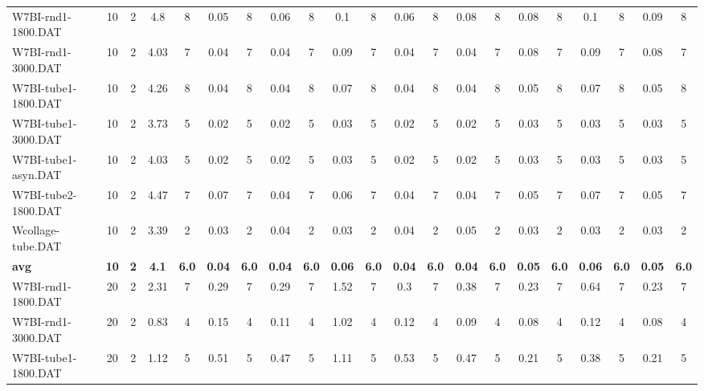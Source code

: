 \begin{sidewaystable}[!ht]
{\begin{tabular}{lcccccccccccccccccccc}
W7BI-rnd1-1800.DAT & 10 & 2 & 4.8 & 8 &  \textcolor{blue2}{0.05} & 8 & 0.06 & 8 & 0.1 & 8 & 0.06 & 8 & 0.08 & 8 & 0.08 & 8 & 0.1 & 8 & 0.09 & 8 \\
W7BI-rnd1-3000.DAT & 10 & 2 & 4.03 & 7 &  \textcolor{blue2}{0.04} & 7 &  \textcolor{blue2}{0.04} & 7 & 0.09 & 7 &  \textcolor{blue2}{0.04} & 7 &  \textcolor{blue2}{0.04} & 7 & 0.08 & 7 & 0.09 & 7 & 0.08 & 7 \\
W7BI-tube1-1800.DAT & 10 & 2 & 4.26 & 8 &  \textcolor{blue2}{0.04} & 8 &  \textcolor{blue2}{0.04} & 8 & 0.07 & 8 &  \textcolor{blue2}{0.04} & 8 &  \textcolor{blue2}{0.04} & 8 & 0.05 & 8 & 0.07 & 8 & 0.05 & 8 \\
W7BI-tube1-3000.DAT & 10 & 2 & 3.73 & 5 &  \textcolor{blue2}{0.02} & 5 &  \textcolor{blue2}{0.02} & 5 & 0.03 & 5 &  \textcolor{blue2}{0.02} & 5 &  \textcolor{blue2}{0.02} & 5 & 0.03 & 5 & 0.03 & 5 & 0.03 & 5 \\
W7BI-tube1-asyn.DAT & 10 & 2 & 4.03 & 5 &  \textcolor{blue2}{0.02} & 5 &  \textcolor{blue2}{0.02} & 5 & 0.03 & 5 &  \textcolor{blue2}{0.02} & 5 &  \textcolor{blue2}{0.02} & 5 & 0.03 & 5 & 0.03 & 5 & 0.03 & 5 \\
W7BI-tube2-1800.DAT & 10 & 2 & 4.47 & 7 & 0.07 & 7 &  \textcolor{blue2}{0.04} & 7 & 0.06 & 7 &  \textcolor{blue2}{0.04} & 7 &  \textcolor{blue2}{0.04} & 7 & 0.05 & 7 & 0.07 & 7 & 0.05 & 7 \\
Wcollage-tube.DAT & 10 & 2 & 3.39 & 2 &  \textcolor{blue2}{0.03} & 2 & 0.04 & 2 &  \textcolor{blue2}{0.03} & 2 & 0.04 & 2 & 0.05 & 2 &  \textcolor{blue2}{0.03} & 2 &  \textcolor{blue2}{0.03} & 2 &  \textcolor{blue2}{0.03} & 2 \\
\cline{1-21} \textbf{avg} & \textbf{10} & \textbf{2} & \textbf{4.1} & \textbf{6.0} & \textbf{0.04} & \textbf{6.0} & \textbf{0.04} & \textbf{6.0} & \textbf{0.06} & \textbf{6.0} & \textbf{0.04} & \textbf{6.0} & \textbf{0.04} & \textbf{6.0} & \textbf{0.05} & \textbf{6.0} & \textbf{0.06} & \textbf{6.0} & \textbf{0.05} & \textbf{6.0} \\ \cline{1-21}
W7BI-rnd1-1800.DAT & 20 & 2 & 2.31 & 7 & 0.29 & 7 & 0.29 & 7 & 1.52 & 7 & 0.3 & 7 & 0.38 & 7 &  \textcolor{blue2}{0.23} & 7 & 0.64 & 7 &  \textcolor{blue2}{0.23} & 7 \\
W7BI-rnd1-3000.DAT & 20 & 2 & 0.83 & 4 & 0.15 & 4 & 0.11 & 4 & 1.02 & 4 & 0.12 & 4 & 0.09 & 4 &  \textcolor{blue2}{0.08} & 4 & 0.12 & 4 &  \textcolor{blue2}{0.08} & 4 \\
W7BI-tube1-1800.DAT & 20 & 2 & 1.12 & 5 & 0.51 & 5 & 0.47 & 5 & 1.11 & 5 & 0.53 & 5 & 0.47 & 5 &  \textcolor{blue2}{0.21} & 5 & 0.38 & 5 &  \textcolor{blue2}{0.21} & 5 \\

\end{tabular}}
\end{sidewaystable}
